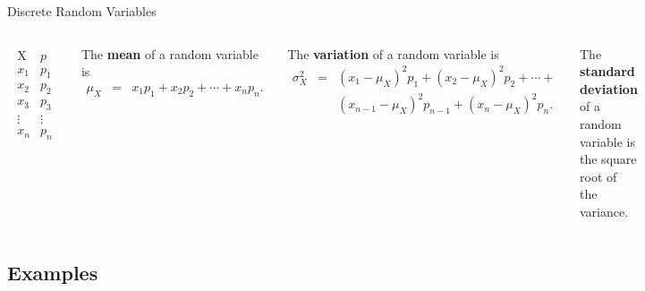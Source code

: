 \begin{frame}{Discrete Random Variables}

  \begin{columns}
    \begin{eqnarray*}
      \begin{array}{l|l}
        \mathrm{X} & p \\ \hline
        x_1 & p_1 \\
        x_2 & p_2 \\
        x_3 & p_3 \\
        \vdots & \vdots \\
        x_n & p_n
      \end{array}
    \end{eqnarray*}
    \vfill

    {
      \begin{definition}
        The \textbf{mean} of a random variable is
        \begin{eqnarray*}
          \mu_X & = & x_1 p_1 + x_2 p_2 + \cdots + x_n p_n.
        \end{eqnarray*}
      \end{definition}
    }

    {
      \begin{definition}
        The \textbf{variation} of a random variable is
        \begin{eqnarray*}
          \sigma^2_X & = & (x_1-\mu_X)^2 p_1 + (x_2-\mu_X)^2 p_2 + \cdots + \\
                     &   & (x_{n-1}-\mu_X)^2 p_{n-1} + (x_n-\mu_X)^2 p_n.
        \end{eqnarray*}
      \end{definition}
    }

    {
      \begin{definition}
        The \textbf{standard deviation} of a random variable is the
        square root of the variance.
      \end{definition}
    }

    
  \end{columns}
  
\end{frame}


\subsection{Examples}


